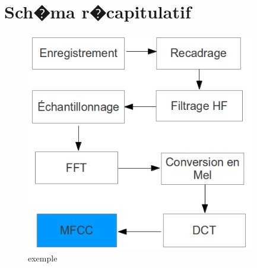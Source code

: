 \section{Sch�ma r�capitulatif}
\begin{figure}[hb]
    \begin{center}
	    \includegraphics[width=10cm]{Images/diagramme.png} 
    \end{center}
    \caption{exemple}
\end{figure}
